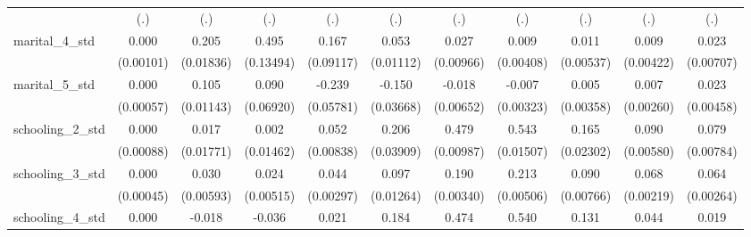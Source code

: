 {\begin{tabular}{l*{10}{c}}
                    &         (.)         &         (.)         &         (.)         &         (.)         &         (.)         &         (.)         &         (.)         &         (.)         &         (.)         &         (.)         \\
marital\_4\_std       &       0.000         &       0.205\sym{***}&       0.495\sym{***}&       0.167         &       0.053\sym{***}&       0.027\sym{**} &       0.009\sym{*}  &       0.011\sym{*}  &       0.009\sym{*}  &       0.023\sym{**} \\
                    &   (0.00101)         &   (0.01836)         &   (0.13494)         &   (0.09117)         &   (0.01112)         &   (0.00966)         &   (0.00408)         &   (0.00537)         &   (0.00422)         &   (0.00707)         \\
marital\_5\_std       &       0.000         &       0.105\sym{***}&       0.090         &      -0.239\sym{***}&      -0.150\sym{***}&      -0.018\sym{**} &      -0.007\sym{*}  &       0.005         &       0.007\sym{**} &       0.023\sym{***}\\
                    &   (0.00057)         &   (0.01143)         &   (0.06920)         &   (0.05781)         &   (0.03668)         &   (0.00652)         &   (0.00323)         &   (0.00358)         &   (0.00260)         &   (0.00458)         \\
schooling\_2\_std     &       0.000         &       0.017         &       0.002         &       0.052\sym{***}&       0.206\sym{***}&       0.479\sym{***}&       0.543\sym{***}&       0.165\sym{***}&       0.090\sym{***}&       0.079\sym{***}\\
                    &   (0.00088)         &   (0.01771)         &   (0.01462)         &   (0.00838)         &   (0.03909)         &   (0.00987)         &   (0.01507)         &   (0.02302)         &   (0.00580)         &   (0.00784)         \\
schooling\_3\_std     &       0.000         &       0.030\sym{***}&       0.024\sym{***}&       0.044\sym{***}&       0.097\sym{***}&       0.190\sym{***}&       0.213\sym{***}&       0.090\sym{***}&       0.068\sym{***}&       0.064\sym{***}\\
                    &   (0.00045)         &   (0.00593)         &   (0.00515)         &   (0.00297)         &   (0.01264)         &   (0.00340)         &   (0.00506)         &   (0.00766)         &   (0.00219)         &   (0.00264)         \\
schooling\_4\_std     &       0.000         &      -0.018         &      -0.036\sym{*}  &       0.021\sym{*}  &       0.184\sym{***}&       0.474\sym{***}&       0.540\sym{***}&       0.131\sym{***}&       0.044\sym{***}&       0.019\sym{*}  \\

\end{tabular}}
